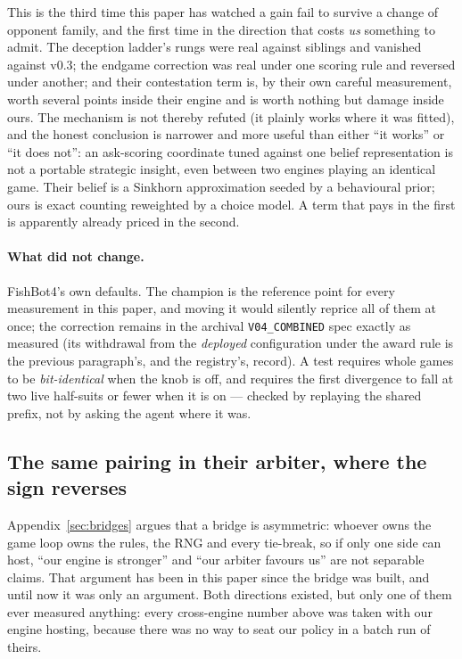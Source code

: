 \documentclass[11pt,letterpaper]{article}
\begin{document}
This is the third time this paper has watched a gain fail to survive a
change of opponent family, and the first time in the direction that costs
\emph{us} something to admit. The deception ladder's rungs were real
against siblings and vanished against v0.3; the endgame correction was
real under one scoring rule and reversed under another; and their
contestation term is, by their own careful measurement, worth several
points inside their engine and is worth nothing but damage inside ours.
The mechanism is not thereby refuted (it plainly works where it was
fitted), and the honest conclusion is narrower and more useful than
either ``it works'' or ``it does not'': an ask-scoring coordinate tuned
against one belief representation is not a portable strategic insight,
even between two engines playing an identical game. Their belief is a
Sinkhorn approximation seeded by a behavioural prior; ours is exact
counting reweighted by a choice model. A term that pays in the first is
apparently already priced in the second.

\paragraph{What did not change.} FishBot4's own defaults. The champion is the
reference point for every measurement in this paper, and moving it would
silently reprice all of them at once; the correction remains in the archival
\texttt{V04\_COMBINED} spec exactly as measured (its withdrawal from the
\emph{deployed} configuration under the award rule is the previous
paragraph's, and the registry's, record). A test requires whole games to
be \emph{bit-identical} when the knob is off, and requires the first divergence
to fall at two live half-suits or fewer when it is on --- checked by replaying
the shared prefix, not by asking the agent where it was.

\subsection{The same pairing in their arbiter, where the sign reverses}
\label{sec:otherarbiter}

Appendix~\ref{sec:bridges} argues that a bridge is asymmetric: whoever owns the
game loop owns the rules, the RNG and every tie-break, so if only one side can
host, ``our engine is stronger'' and ``our arbiter favours us'' are not
separable claims. That argument has been in this paper since the bridge was
built, and until now it was only an argument. Both directions existed, but only
one of them ever measured anything: every cross-engine number above was taken
with our engine hosting, because there was no way to seat our policy in a batch
run of theirs.
\end{document}
